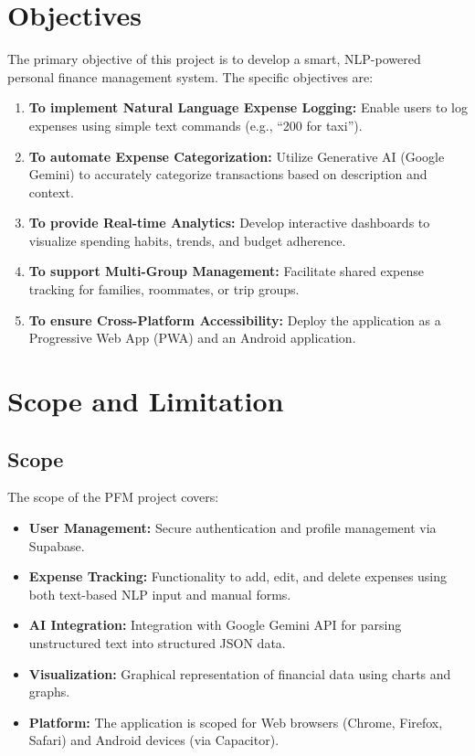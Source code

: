 \section{Objectives}
The primary objective of this project is to develop a smart, NLP-powered personal finance management system. The specific objectives are:

\begin{enumerate}
    \item \textbf{To implement Natural Language Expense Logging:} Enable users to log expenses using simple text commands (e.g., ``200 for taxi'').
    \item \textbf{To automate Expense Categorization:} Utilize Generative AI (Google Gemini) to accurately categorize transactions based on description and context.
    \item \textbf{To provide Real-time Analytics:} Develop interactive dashboards to visualize spending habits, trends, and budget adherence.
    \item \textbf{To support Multi-Group Management:} Facilitate shared expense tracking for families, roommates, or trip groups.
    \item \textbf{To ensure Cross-Platform Accessibility:} Deploy the application as a Progressive Web App (PWA) and an Android application.
\end{enumerate}

\section{Scope and Limitation}

\subsection{Scope}
The scope of the PFM project covers:
\begin{itemize}
    \item \textbf{User Management:} Secure authentication and profile management via Supabase.
    \item \textbf{Expense Tracking:} Functionality to add, edit, and delete expenses using both text-based NLP input and manual forms.
    \item \textbf{AI Integration:} Integration with Google Gemini API for parsing unstructured text into structured JSON data.
    \item \textbf{Visualization:} Graphical representation of financial data using charts and graphs.
    \item \textbf{Platform:} The application is scoped for Web browsers (Chrome, Firefox, Safari) and Android devices (via Capacitor).
\end{itemize}

